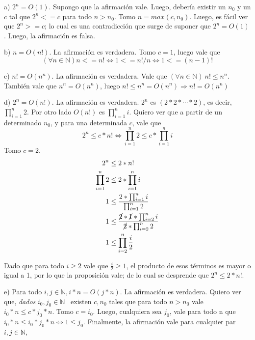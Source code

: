 \documentclass[11pt, spanish]{article}
\begin{document}
a) $2^n = O(1)$. Supongo que la afirmación vale. Luego, debería existir un $n_0$ y un $c$ tal que $2^n <= c$ para todo $n>n_0$. Tomo $n=max(c,n_0)$. Luego, es fácil ver que $2^{n} >= c$; lo cual es una contradicción que surge de suponer que $2^n = O(1)$. Luego, la afirmación es falsa.

\vspace{1em}
b) $n = O(n!)$.
La afirmación es verdadera. Tomo $c=1$, luego vale que 
\[
(\forall n \in \mathbb{N}) n <= n! \iff 1 <= n!/n \iff 1 <= (n-1)!
\]

\vspace{1em}
c) $n! = O(n^n)$.
La afirmación es verdadera. Vale que $(\forall n \in \mathbb{N})\ n! \leq n^n$. También vale que $n^n = O(n^n)$, luego $n! \leq n^n = O(n^n) \Rightarrow n! = O(n^n)$

\vspace{1em}
d) $2^n = O(n!)$. La afirmación es verdadera. $2^n$ es $(2 * 2 * \cdots * 2)$, es decir, $\prod_{i=1}^{n}2$. Por otro lado $O(n!)$ es $\prod_{i=1}^{n}i$. Quiero ver que a partir de un determinado $n_0$, y para una determinada $c$, vale que \[
2^n \leq c*n! \iff \prod_{i=1}^{n}2 \leq c*\prod_{i=1}^{n}i
\]
Tomo $c=2$.
\begin{equation*}\begin{split}
2^n &\leq 2*n!\\
\prod_{i=1}^{n}2 &\leq 2*\prod_{i=1}^{n}i\\
1 &\leq \frac{2*\prod_{i=1}^{n}i}{\prod_{i=1}^{n}2}\\
1 &\leq \frac{\cancel{2}*\cancel{1}*\prod_{i=2}^{n}i}{\cancel{2}* \prod_{i=2}^{n}2}\\
1 &\leq \prod_{i=2}^{n}{\frac{i}{2}}\\
\end{split}\end{equation*}

Dado que para todo $i\geq2$ vale que $\frac{i}{2}\geq1$, el producto de esos términos es mayor o igual a 1, por lo que la proposición vale; de lo cual se desprende que $2^n \leq 2*n!$.

\vspace{1em}
e) Para todo $i,j \in \mathbb{N}, i*n = O(j*n)$. La afirmación es verdadera. Quiero ver que, \emph{dados} $i_0,j_0 \in \mathbb{N}$ \ existen $c, n_0$ tales que para todo $n>n_0$ vale $i_0*n \leq c*j_0*n$. Tomo $c=i_0$. Luego, cualquiera sea $j_0$, vale para todo n que $i_0*n \leq i_0*j_0*n \iff 1 \leq j_0$. Finalmente, la afirmación vale para cualquier par $i,j \in \mathbb{N}$,
\end{document}
